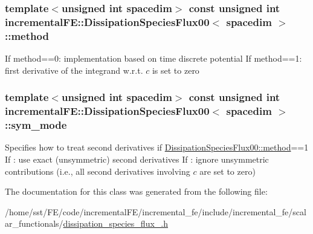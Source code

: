 \subsubsection[{\texorpdfstring{method}{method}}]{\setlength{\rightskip}{0pt plus 5cm}template$<$unsigned int spacedim$>$ const unsigned int {\bf incremental\+F\+E\+::\+Dissipation\+Species\+Flux00}$<$ spacedim $>$\+::method\hspace{0.3cm}{\ttfamily [private]}}\hypertarget{classincremental_f_e_1_1_dissipation_species_flux00_ace59a69f460f6d0da34579b58b0b53d6}{}\label{classincremental_f_e_1_1_dissipation_species_flux00_ace59a69f460f6d0da34579b58b0b53d6}
If {\ttfamily method==0}\+: implementation based on time discrete potential If {\ttfamily method==1}\+: first derivative of the integrand w.\+r.\+t. $c$ is set to zero 
\subsubsection[{\texorpdfstring{sym\+\_\+mode}{sym_mode}}]{\setlength{\rightskip}{0pt plus 5cm}template$<$unsigned int spacedim$>$ const unsigned int {\bf incremental\+F\+E\+::\+Dissipation\+Species\+Flux00}$<$ spacedim $>$\+::sym\+\_\+mode\hspace{0.3cm}{\ttfamily [private]}}\hypertarget{classincremental_f_e_1_1_dissipation_species_flux00_ab16196704d97ae4a31dfd14a03338d19}{}\label{classincremental_f_e_1_1_dissipation_species_flux00_ab16196704d97ae4a31dfd14a03338d19}
Specifies how to treat second derivatives if \hyperlink{classincremental_f_e_1_1_dissipation_species_flux00_ace59a69f460f6d0da34579b58b0b53d6}{Dissipation\+Species\+Flux00\+::method}==1 If {}\+: use exact (unsymmetric) second derivatives If {}\+: ignore unsymmetric contributions (i.\+e., all second derivatives involving $c$ are set to zero) 

The documentation for this class was generated from the following file\+:\begin{DoxyCompactItemize}
\item 
/home/sst/\+F\+E/code/incremental\+F\+E/incremental\+\_\+fe/include/incremental\+\_\+fe/scalar\+\_\+functionals/\hyperlink{dissipation__species__flux__00_8h}{dissipation\+\_\+species\+\_\+flux\+\_.\+h}\end{DoxyCompactItemize}
